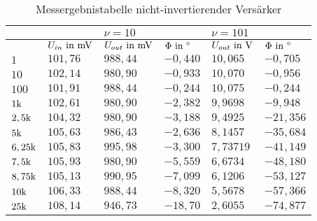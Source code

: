 \begin{table}[H]
\centering
\caption{Messergebnistabelle nicht-invertierender Versärker}
\label{tab:niinv_erg_tab}
\begin{tabular}{ll||l|l||l|l|}
\cline{3-6}
                                                   &                & \multicolumn{2}{l|}{$\nu = 10$}     & \multicolumn{2}{l|}{$\nu=101$}          \\ \hline
\rowcolor[HTML]{C0C0C0} 
\multicolumn{1}{|l|}{\cellcolor[HTML]{C0C0C0}$f\text{ in }\Hz $} & $ U_{in}\text{ in }\text{mV}$ & $ U_{out}\text{ in }\text{mV} $    & $ \Phi\text{ in }^\circ $           & $ U_{out}\text{ in }\text{V} $       & $ \Phi \text{ in }^\circ $            \\ \hline
\multicolumn{1}{|l|}{$1        $}               & $ 101,76 $  & $ 988,44  $ & $ -0,440  $ & $ 10,065      $ & $ -0,705   $ \\ \hline
\multicolumn{1}{|l|}{$10      $}                & $ 102,14 $  & $ 980,90  $ & $ -0,933  $ & $ 10,070      $ & $ -0,956   $ \\ \hline
\multicolumn{1}{|l|}{$100      $}               & $ 101,91 $  & $ 988,44  $ & $ -0,244  $ & $ 10,075      $ & $ -0,244   $ \\ \hline
\multicolumn{1}{|l|}{$1\text{k}      $}                & $ 102,61 $  & $ 980,90  $ & $ -2,382  $ & $ 9,9698      $ & $ -9,948  $  \\ \hline
\multicolumn{1}{|l|}{$2,5\text{k}    $}                & $ 104,32 $  & $ 980,90  $ & $ -3,188  $ & $ 9,4925      $ & $ -21,356  $ \\ \hline
\multicolumn{1}{|l|}{$5\text{k}      $}                & $ 105,63 $  & $ 986,43  $ & $ -2,636  $ & $ 8,1457      $ & $ -35,684  $ \\ \hline
\multicolumn{1}{|l|}{$6,25\text{k}   $}                & $ 105,83 $  & $ 995,98  $ & $ -3,300  $ & $ 7,73719     $ & $ -41,149  $ \\ \hline
\multicolumn{1}{|l|}{$7,5\text{k}    $}                & $ 105,93 $  & $ 980,90  $ & $ -5,559  $ & $ 6,6734      $ & $ -48,180  $ \\ \hline
\multicolumn{1}{|l|}{$8,75\text{k}   $}                & $ 105,13 $  & $ 990,95  $ & $ -7,099  $ & $ 6,1206      $ & $ -53,127  $ \\ \hline
\multicolumn{1}{|l|}{$10\text{k}     $}                & $ 106,33 $  & $ 988,44  $ & $ -8,320  $ & $ 5,5678      $ & $ -57,366  $ \\ \hline
\multicolumn{1}{|l|}{$25\text{k}     $}                & $ 108,14 $  & $ 946,73  $ & $ -18,70  $ & $ 2,6055      $ & $ -74,877  $ \\ \hline

\end{tabular}
\end{table}
